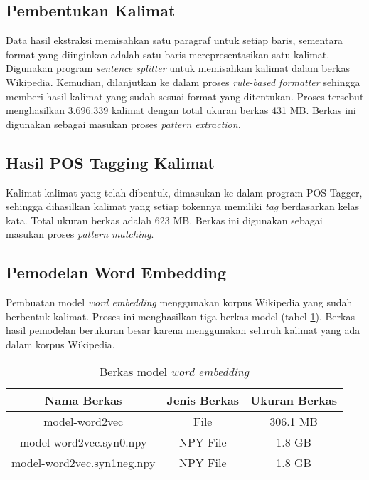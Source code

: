 \subsection{Pembentukan Kalimat}
Data hasil ekstraksi memisahkan satu paragraf untuk setiap baris, sementara format yang diinginkan adalah satu baris merepresentasikan satu kalimat. Digunakan program \textit{sentence splitter} untuk memisahkan kalimat dalam berkas Wikipedia. Kemudian, dilanjutkan ke dalam proses \textit{rule-based formatter} sehingga memberi hasil kalimat yang sudah sesuai format yang ditentukan. Proses tersebut menghasilkan 3.696.339 kalimat dengan total ukuran berkas 431 MB. Berkas ini digunakan sebagai masukan proses \textit{pattern extraction.} 

\subsection{Hasil POS Tagging Kalimat}
Kalimat-kalimat yang telah dibentuk, dimasukan ke dalam program POS Tagger, sehingga dihasilkan kalimat yang setiap tokennya memiliki \textit{tag} berdasarkan kelas kata. Total ukuran berkas adalah 623 MB. Berkas ini digunakan sebagai masukan proses \textit{pattern matching}. 

\subsection{Pemodelan Word Embedding}
Pembuatan model \textit{word embedding} menggunakan korpus Wikipedia yang sudah berbentuk kalimat. Proses ini menghasilkan tiga berkas model (tabel \ref{table:modelWE}). Berkas hasil pemodelan berukuran besar karena menggunakan seluruh kalimat yang ada dalam korpus Wikipedia.
\begin{table}
  \centering
    \caption{Berkas model \textit{word embedding}}
    \label{table:modelWE}
    \begin{tabular}{|c|c|c|}
      \hline
        Nama Berkas                       & Jenis Berkas & Ukuran Berkas \\ \hline
        model-word2vec                    & File         & 306.1 MB      \\ \hline
        model-word2vec.syn0.npy           & NPY File     & 1.8 GB        \\ \hline
        model-word2vec.syn1neg.npy        & NPY File     & 1.8 GB        \\ \hline
    \end{tabular}
\end{table}

